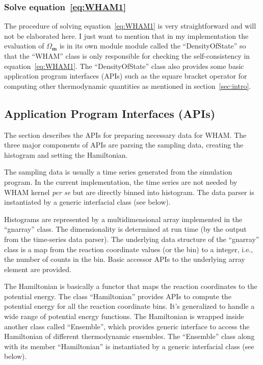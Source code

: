\subsubsection{Solve equation~\ref{eq:WHAM1}}
The procedure of solving equation~\ref{eq:WHAM1} is very straightforward and
will not be elaborated here. I just want to mention that in my implementation
the evaluation of $\Omega_{\mathbf{m}}$ is in its own module module called the
``DensityOfState'' so that the ``WHAM'' class is only responsible for checking
the self-consistency in equation~\ref{eq:WHAM1}.  The ``DensityOfState'' class
also provides some basic application program interfaces (APIs) such as the
square bracket operator for computing other thermodynamic quantities as
mentioned in section~\ref{sec:intro}.

\subsection{Application Program Interfaces (APIs)}
The section describes the APIs for preparing necessary data for WHAM. The three
major components of APIs are parsing the sampling data, creating the histogram 
and setting the Hamiltonian.

The sampling data is usually a time series generated from the simulation
program. In the current implementation, the time series are not needed by WHAM
kernel \textit{per se} but are directly binned into histogram. The data parser 
is instantiated by a generic interfacial class (see below). 

Histograms are represented by a multidimensional array implemented in the
``gnarray'' class. The dimensionality is determined at run time (by the output 
from the time-series data parser). The underlying data structure of the 
``gnarray'' class is a map from the reaction coordinate values (or the bin)
to a integer, i.e., the number of counts in the bin. Basic accessor APIs
to the underlying array element are provided.

The Hamiltonian is basically a functor that maps the reaction coordinates 
to the potential energy. The class ``Hamiltonian'' provides APIs to 
compute the potential energy for all the reaction coordinate bins. It's 
generalized to handle a wide range of potential energy functions. The 
Hamiltonian is wrapped inside another class called ``Ensemble'', 
which provides generic interface to access the Hamiltonian of different 
thermodynamic ensembles. The ``Ensemble'' class along with its member
``Hamiltonian'' is instantiated by a generic interfacial class (see below).

